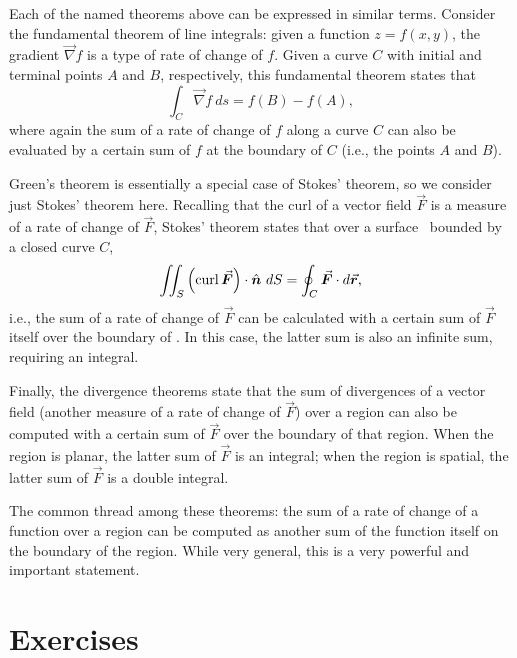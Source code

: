 Each of the named theorems above can be expressed in similar terms. Consider the fundamental theorem of line integrals: given a function $z=f(x,y)$, the gradient $\vec{\nabla} f$ is a type of rate of change of $f$. Given a curve $C$ with initial and terminal points $A$ and $B$, respectively, this fundamental theorem states that 
$$\int_C \vec{\nabla} f\ ds = f(B) - f(A),$$
where again the sum of a rate of change of $f$ along a curve $C$ can also be evaluated by a certain sum of $f$ at the boundary of $C$ (i.e., the points $A$ and $B$).

Green's theorem is essentially a special case of Stokes' theorem, so we consider just Stokes' theorem here. Recalling that the curl of a vector field $\vec F$ is a measure of a rate of change of $\vec F$, Stokes' theorem states that over a surface \surfaceS\ bounded by a closed curve $C$,
$$\iint_S \left(\curl \vec F\right)\cdot \hat n\ dS = \oint_C \vec F\cdot d\vec r,$$
i.e., the sum of a rate of change of $\vec F$ can be calculated with a certain sum of $\vec F$ itself over the boundary of \surfaceS. In this case, the latter sum is also an infinite sum, requiring an integral. 

Finally, the divergence theorems state that the sum of divergences of a vector field (another measure of a rate of change of $\vec F$) over a region can also be computed with a certain sum of $\vec F$ over the boundary of that region. When the region is planar, the latter sum of $\vec F$ is an integral; when the region is spatial, the latter sum of $\vec F$ is a double integral.

The common thread among these theorems: the sum of a rate of change of a function over a region can be computed as another sum of the function itself on the boundary of the region. While very general, this is a very powerful and important statement.




\newpage
\section{Exercises}
\renewcommand{\ExerciseListName}{Assignement}

